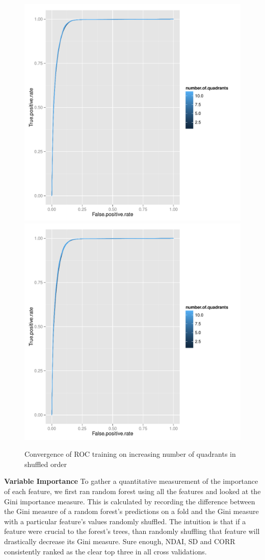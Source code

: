 \documentclass{article}\usepackage[]{graphicx}\usepackage[]{color}
\begin{document}
  \begin{figure}[H]
  \includegraphics[width=\linewidth, height = 170pts ]{ROC_converge_shuffle1.pdf}
\endminipage\hfill
{}
  \includegraphics[width=\linewidth, height = 170pts]{ROC_converge_shuffle2.pdf}
\endminipage\hfill
  \caption{Convergence of ROC training on increasing number of quadrants in shuffled order}\label{}
\end{figure}
  
{\bf Variable Importance} To gather a quantitative measurement of the importance of each feature, we first ran random forest using all the features and looked at the Gini importance measure.  This is calculated by recording the difference between the Gini measure of a random forest's predictions on a fold and the Gini measure with a particular feature's values randomly shuffled.  The intuition is that if a feature were crucial to the forest's trees, than randomly shuffling that feature will drastically decrease its Gini measure.  Sure enough, NDAI, SD and CORR   consistently ranked as the clear top three in all cross validations. \\
\end{document}
